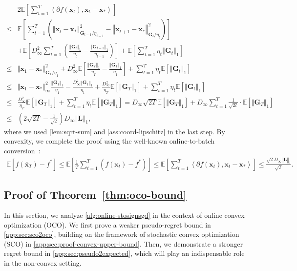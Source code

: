 \documentclass{article}
\def \E {\mathbb{E}}
\def \x {\mathbf{x}}
\def \Gb {\mathbf{G}}
\def \Lb {\mathbf{L}}
\def \xb {\overline{\x}}
\newcommand{\inner}[2]{\left\langle #1, #2 \right\rangle}
\newcommand{\norm}[1]{\left\Vert#1\right\Vert}
\newcommand{\sqbrac}[1]{\left[#1\right]}
\newcommand{\brac}[1]{\left(#1\right)}
\begin{document}
\begin{equation}\label{eq:convex-telescoping}
    \begin{aligned}
        &2\E\sqbrac{\sum_{t=1}^T\inner{\partial f(\x_t)}{\x_{t}-\x_*}}\\\le& \E\sqbrac{\sum_{t=1}^T\brac{\norm{\x_t-\x_*}^2_{\Gb_{t-1}/\eta_{t-1}}-\norm{\x_{t+1}-\x_*}^2_{\Gb_t/\eta_t}}}\\&+\E\sqbrac{D_\infty^2\sum_{t=1}^T\brac{\frac{\norm{\Gb_t}_1}{\eta_t}-\frac{\norm{\Gb_{t-1}}_1}{\eta_{t-1}}}}+\E\sqbrac{\sum_{t=1}^T\eta_t\norm{\Gb_t}_1}\\\le&\norm{\x_1-\x_*}^2_{\Gb_1/\eta_1}+D_\infty^2\E\sqbrac{\frac{\norm{\Gb_T}_1}{\eta_T}-\frac{\norm{\Gb_1}_1}{\eta_1}}+\sum_{t=1}^T\eta_t\E\sqbrac{\norm{\Gb_t}_1}\\\le&\norm{\x_1-\x_*}^2_\infty\frac{\norm{\Gb_1}_1}{\eta_1}-\frac{D_\infty^2\norm{\Gb_1}_1}{\eta_1}+\frac{D_\infty^2}{\eta_T}\E\sqbrac{\norm{\Gb_T}_1}+\sum_{t=1}^T\eta_t\E\sqbrac{\norm{\Gb_t}_1}\\\le&\frac{D_\infty^2}{\eta_T}\E\sqbrac{\norm{\Gb_T}_1}+\sum_{t=1}^T\eta_t\E\sqbrac{\norm{\Gb_T}_1}=D_\infty\sqrt{2T}\E\sqbrac{\norm{\Gb_T}_1}+D_\infty\sum_{t=1}^T\frac{1}{\sqrt{2t}}\cdot\E\sqbrac{\norm{\Gb_T}_1}\\\le&\brac{2\sqrt{2T}-\frac{1}{\sqrt{2}}}D_\infty\norm{\Lb}_1,
    \end{aligned}
\end{equation}
where we used \cref{lem:sqrt-sum} and \cref{ass:coord-lipschitz} in the last step. By convexity, we complete the proof using the well-known online-to-batch conversion~\citep{cesa2006prediction}:
\begin{align*}
    \E\sqbrac{f(\xb_T)-f^*}\le\E\sqbrac{\frac{1}{T}\sum_{t=1}^T\brac{f(\x_t)-f^*}}\le\E\sqbrac{\sum_{t=1}^T\inner{\partial f(\x_t)}{\x_{t}-\x_*}}\le\frac{\sqrt{2}D_\infty\norm{\Lb}_1}{\sqrt{T}}. 
\end{align*}

\subsection{Proof of Theorem~\ref{thm:oco-bound}\label{app:sec:proof-online-upper-bound}}

In this section, we analyze \cref{alg:online-stosignsgd} in the context of online convex optimization (OCO). We first prove a weaker pseudo-regret bound in \cref{app:sec:sco2oco}, building on the framework of stochastic convex optimization (SCO) in \cref{app:sec:proof-convex-upper-bound}. Then, we demonstrate a stronger regret bound in \cref{app:sec:pseudo2expected}, which will play an indispensable role in the non-convex setting.
\end{document}
